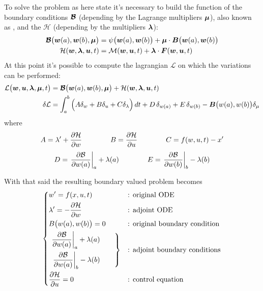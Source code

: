 To solve the problem as here state it's necessary to build the function of the boundary conditions $\boldsymbol{\mathcal B}$ (depending by the Lagrange multipliers $\boldsymbol{\mu}$), also known as , and the  $\mathcal H$ (depending by the multipliers $\boldsymbol{\lambda}$):
\begin{equation}
	\begin{split}
		\boldsymbol{\mathcal B}\big(\boldsymbol{w}(a),\boldsymbol{w}(b),\boldsymbol{\mu}\big) & = \psi\big(\boldsymbol{w}(a),\boldsymbol{w}(b)\big) + \boldsymbol{\mu}\cdot \boldsymbol{B}\big( \boldsymbol{w}(a),\boldsymbol{w}(b) \big) \\
		\mathcal H(\boldsymbol{w},\boldsymbol{\lambda},\boldsymbol{u},t) & = \mathcal M(\boldsymbol{w}, \boldsymbol{u},t) + \boldsymbol{\lambda} \cdot \boldsymbol{F}(\boldsymbol{w},\boldsymbol{u}, t)
	\end{split}
\end{equation}
At this point it's possible to compute the lagrangian $\mathcal L $ on which the variations can be performed:
\begin{equation}
	\begin{split}
		\mathcal L \big( \boldsymbol{w},\boldsymbol{u},\boldsymbol{\lambda}, \boldsymbol{\mu} ,t \big) & = \boldsymbol{\mathcal B}\big(\boldsymbol{w}(a),\boldsymbol{w}(b),\boldsymbol{\mu}\big) + \mathcal H(\boldsymbol{w},\boldsymbol{\lambda},\boldsymbol{u},t) \\
		\delta \mathcal L  & = \int_a^b \Big( A \delta_w + B \delta_u + C \delta_\lambda \Big)\, dt + D \, \delta_{w(a)} + E \, \delta_{w(b)} - \boldsymbol{B} \big(w(a),w(b)\big) \delta_\mu
	\end{split}
\end{equation}
where
\[ A = \lambda' + \frac{\partial \mathcal H}{\partial w} \qquad \qquad B = \frac{\partial \mathcal H}{\partial u} \qquad \qquad C = f(w,u,t) - x' \] \[  D = \left.\frac{\partial \mathcal B}{\partial w(a)}\right|_{a}+ \lambda(a) \qquad \qquad E = \left.\frac{\partial \mathcal B}{\partial w(b)}\right|_{b} -\lambda(b) \]

With that said the resulting boundary valued problem becomes
\begin{equation} \label{eq:opt:generalsolution}
	\left\{ \begin{aligned}
		&w' = f(x,u,t) && \textrm{: original ODE} \\
		&\lambda' = - \frac{\partial \mathcal H}{\partial w} && \textrm{: adjoint ODE} \\
		&B\big(w(a),w(b)\big) = 0 && \textrm{: original boundary condition} \\
		&\left. \begin{aligned}
			\left.\frac{\partial \mathcal B}{\partial w(a)}\right|_{a}+ \lambda(a) \\
			\left.\frac{\partial \mathcal B}{\partial w(a)}\right|_{b} - \lambda(b)
		\end{aligned} \qquad \right\} &&\textrm{: adjoint boundary conditions} \\
		& \frac{\partial \mathcal H}{\partial u} = 0 && \textrm{: control equation}
	\end{aligned} \right. 
\end{equation}


